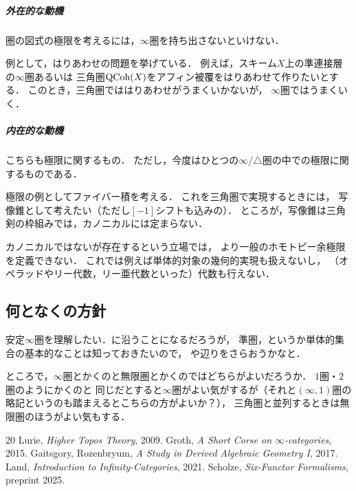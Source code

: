 \subparagraph{外在的な動機}
圏の図式の極限を考えるには，\(\infty\)圏を持ち出さないといけない．

例として，はりあわせの問題を挙げている．
例えば，スキーム\(X\)上の準連接層の\(\infty\)圏あるいは
三角圏\(\operatorname{QCoh}(X)\)をアフィン被覆をはりあわせて作りたいとする．
このとき，三角圏でははりあわせがうまくいかないが，
\(\infty\)圏ではうまくいく．

\subparagraph{内在的な動機}
こちらも極限に関するもの．
ただし，今度はひとつの\(\infty\)/\(\triangle\)圏の中での極限に関するものである．

極限の例としてファイバー積を考える．
これを三角圏で実現するときには，
写像錐として考えたい（ただし\([-1]\)シフトも込みの）．
ところが，写像錐は三角剣の枠組みでは，カノニカルには定まらない．

カノニカルではないが存在するという立場では，
より一般のホモトピー余極限を定義できない．
これでは例えば単体的対象の幾何的実現も扱えないし，
（オペラッドやリー代数，リー亜代数といった）代数も行えない．

\subsection{何となくの方針}
安定\(\infty\)圏を理解したい．\cite{GR17}に沿うことになるだろうが，
準圏，というか単体的集合の基本的なことは知っておきたいので，
\cite{L21}や\cite{G15}辺りをさらおうかなと．

ところで，\(\infty\)圏とかくのと無限圏とかくのではどちらがよいだろうか．
\(1\)圏・\(2\)圏のようにかくのと
同じだとすると\(\infty\)圏がよい気がするが（それと\((\infty,1)\)圏の
略記というのも踏まえるとこちらの方がよいか？），
三角圏と並列するときは無限圏のほうがよい気もする．

\begin{thebibliography}{20} 
     Lurie, \textit{Higher Topos Theory}, 2009.
     Groth, \textit{A Short Corse on \(\infty\)-categories}, 2015.
     Gaitsgory, Rozenbryum, \textit{A Study in Derived Algebraic Geometry I}, 2017.
     Land, \textit{Introduction to Infinity-Categories}, 2021.
     Scholze, \textit{Six-Functor Formalisms}, preprint 2025.
\end{thebibliography}






